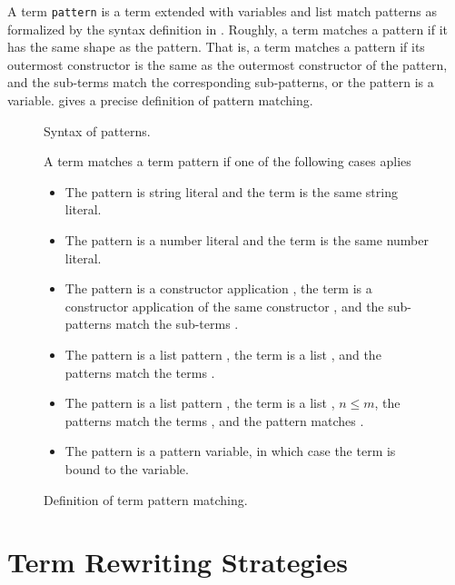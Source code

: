 A term \texttt{pattern} is a term extended with variables and list match
patterns as formalized by the syntax definition in .
Roughly, a term matches a pattern if it has the same
shape as the pattern. That is, a term matches a pattern if its outermost constructor is the
same as the outermost constructor of the pattern, and the sub-terms match the
corresponding sub-patterns, or the pattern is a variable.
 gives a precise definition of pattern matching.

\begin{figure}[p]

\caption{Syntax of patterns.}
\bigbreak
\begin{boxedminipage}{\hsize}
A term matches a term pattern if one of the following cases aplies
\begin{itemize}
  \item The pattern is string literal and the term is the same string literal.
  \item The pattern is a number literal and the term is the same number literal.
  \item The pattern is a constructor application , the
  term is a constructor application  of the same
  constructor , and the sub-patterns  match the sub-terms
  .
  \item The pattern is a list pattern \oldtexttt{[p$_1$,..,p$_n$]}, the term is a list
  \oldtexttt{[t$_1$,..,t$_n$]}, and the patterns  match the
  terms .
  \item The pattern is a list pattern \oldtexttt{[p$_1$,..,p$_n$|p]}, the term is a list
  \oldtexttt{[t$_1$,..,t$_m$]}, $n \leq m$, the patterns 
  match the terms , and the pattern  matches
  \oldtexttt{[t$_{m+1}$,..,t$_m$]}.
  \item The pattern is a pattern variable, in which case the term is bound to
  the variable.
\end{itemize}
\end{boxedminipage}
\caption{Definition of term pattern matching.}
\end{figure}


\section{Term Rewriting Strategies}


